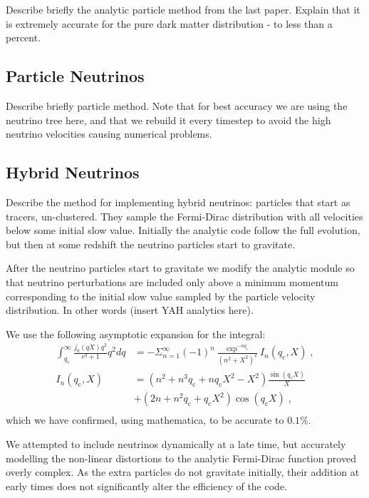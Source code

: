 \documentclass[useAMS, usenatbib]{mnras}
\begin{document}
Describe briefly the analytic particle method from the last paper.
Explain that it is extremely accurate for the pure dark matter distribution - to less than a percent.

\subsection{Particle Neutrinos}
\label{sec:particle}

Describe briefly particle method. Note that for best accuracy we are using the neutrino tree here,
and that we rebuild it every timestep to avoid the high neutrino velocities causing numerical problems.

\subsection{Hybrid Neutrinos}
\label{sec:hybrid}

Describe the method for implementing hybrid neutrinos:
particles that start as tracers, un-clustered. They sample
the Fermi-Dirac distribution with all velocities below some
initial slow value. Initially the analytic code follow the full evolution,
but then at some redshift the neutrino particles start to gravitate.

After the neutrino particles start to gravitate we modify the
analytic module so that neutrino perturbations are included only above a
minimum momentum corresponding to the initial slow value sampled by the
particle velocity distribution. In other words (insert YAH analytics here).

We use the following asymptotic expansion for the integral:
\begin{align}
 \int^\infty_{q_\mathrm{c}} \frac{j_0(qX) q^2}{e^q + 1} q^2 dq &= - \Sigma^{\infty}_{n=1} (-1)^n \frac{\exp^{-n q_\mathrm{c}}}{(n^2+X^2)^2} I_n(q_\mathrm{c},X) \;,\\
 I_n(q_\mathrm{c},X) &= (n^2 + n^3 q_\mathrm{c} + n q_\mathrm{c} X^2 - X^2) \frac{\sin(q_\mathrm{c} X)}{X} \\
 &+ (2n + n^2 q_\mathrm{c} + q_\mathrm{c} X^2) \cos(q_\mathrm{c} X)\;,\\
\end{align}
which we have confirmed, using mathematica, to be accurate to $0.1\%$.


We attempted to include neutrinos dynamically at a late time, but
accurately modelling the non-linear distortions to the analytic
Fermi-Dirac function proved overly complex. As the extra particles
do not gravitate initially, their addition at early times does
not significantly alter the efficiency of the code.
\end{document}
